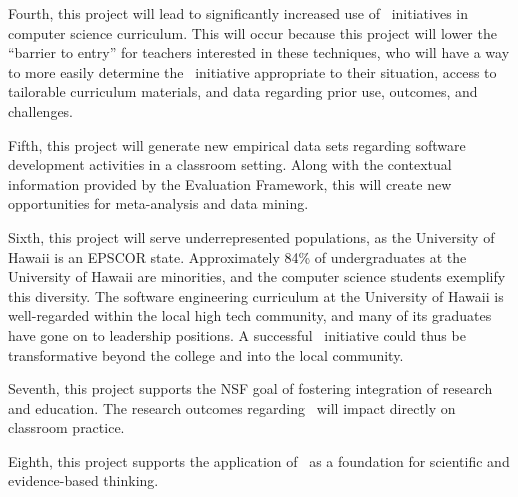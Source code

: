 Fourth, this project will lead to significantly increased use of \eCT\
initiatives in computer science curriculum.  This will occur because this
project will lower the ``barrier to entry'' for teachers interested in
these techniques, who will have a way to more easily determine the \eCT\
initiative appropriate to their situation, access to tailorable curriculum
materials, and data regarding prior use, outcomes, and challenges.

Fifth, this project will generate new empirical data sets regarding
software development activities in a classroom setting.  Along with the
contextual information provided by the Evaluation Framework, this will
create new opportunities for meta-analysis and data mining.  

Sixth, this project will serve underrepresented populations, as the
University of Hawaii is an EPSCOR state. Approximately 84\% of
undergraduates at the University of Hawaii are minorities, and the computer
science students exemplify this diversity.  The software engineering
curriculum at the University of Hawaii is well-regarded within the local
high tech community, and many of its graduates have gone on to leadership
positions. A successful \eCT\ initiative could thus be transformative
beyond the college and into the local community.

Seventh, this project supports the NSF goal of fostering integration of
research and education.  The research outcomes regarding \eCT\ will impact
directly on classroom practice.

Eighth, this project supports the application of \eCT\ as a foundation for
scientific and evidence-based thinking.








 










